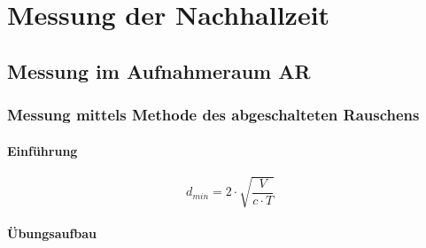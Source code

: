 \documentclass[11pt]{report}
\begin{document}


%

\newpage
\tableofcontents  

%




\listoffigures 


\pagestyle{headings}


\chapter{Messung der Nachhallzeit}
\section{Messung im Aufnahmeraum AR}
\subsection{Messung mittels Methode des abgeschalteten Rauschens}
\subsubsection{Einführung}
\begin{equation}
d_{min}=2\cdot \sqrt{\frac{V}{c\cdot T}}
\end{equation}
\subsubsection{Übungsaufbau}
\end{document}
